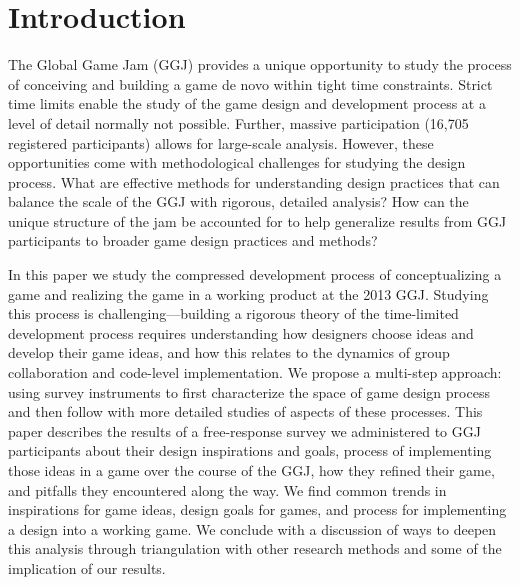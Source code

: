\documentclass{sig-alternate}
\begin{document}
\section{Introduction}
The Global Game Jam (GGJ) provides a unique opportunity to study the process of conceiving and building a game de novo within tight time constraints. Strict time limits enable the study of the game design and development process at a level of detail normally not possible. Further, massive participation (16,705 registered participants) allows for large-scale analysis.
However, these opportunities come with methodological challenges for studying the design process. What are effective methods for understanding design practices that can balance the scale of the GGJ with rigorous, detailed analysis? How can the unique structure of the jam be accounted for to help generalize results from GGJ participants to broader game design practices and methods?


In this paper we study the compressed development process of conceptualizing a game and realizing the game in a working product at the 2013 GGJ. Studying this process is challenging---building a rigorous theory of the time-limited development process requires understanding how designers choose ideas and develop their game ideas, and how this relates to the dynamics of group collaboration and code-level implementation. 
We propose a multi-step approach: 
using survey instruments to first characterize the space of game design process
and then follow with more detailed studies of aspects of these processes.
This paper describes the results of a free-response survey we administered to GGJ participants about their design inspirations and goals, process of implementing those ideas in a game over the course of the GGJ, how they refined their game, and pitfalls they encountered along the way. 
We find common trends in inspirations for game ideas, design goals for games, and process for implementing a design into a working game.
We conclude with a discussion of ways to deepen this analysis through triangulation with other research methods and some of the implication of our results.


\end{document}
